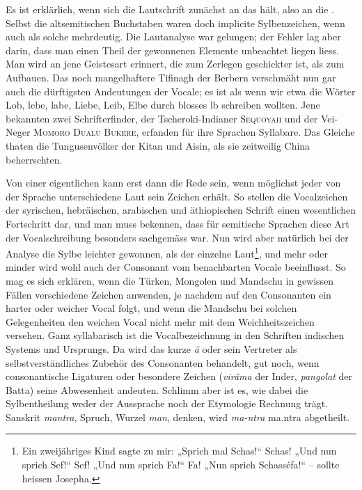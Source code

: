 Es ist erklärlich, wenn sich die Lautschrift zunächst an das  hält, also an die . Selbst die altsemitischen Buchstaben waren doch implicite Sylbenzeichen, wenn auch als solche mehrdeutig. Die Lautanalyse war gelungen; der Fehler lag aber darin, dass man einen Theil der gewonnenen Elemente unbeachtet liegen liess. Man wird an jene Geistesart erinnert, die zum Zerlegen geschickter ist, als zum Aufbauen. Das noch mangelhaftere Tifinagh der Berbern verschmäht nun gar auch die dürftigsten Andeutungen der Vocale; es ist als wenn wir \label{fp.140} etwa die Wörter Lob, lebe, labe, Liebe, Leib, Elbe durch blosses lb schreiben wollten. Jene bekannten zwei Schrifterfinder, der Tscheroki-Indianer \textsc{Sequoyah} und der Vei-Neger \textsc{Momoro Dualu Bukere}, erfanden für ihre Sprachen Syllabare. Das Gleiche thaten die Tungusenvölker der Kitan und Aisin, als sie zeitweilig China beherrschten.

\largerpage[1]Von einer eigentlichen  kann erst dann die Rede sein, wenn möglichst jeder von der Sprache unterschiedene Laut sein Zeichen erhält. So stellen die Vocalzeichen der syrischen, hebräischen, arabischen und äthiopischen Schrift einen wesentlichen Fortschritt dar, und man muss bekennen, dass für semitische Sprachen diese Art der Vocalschreibung besonders sachgemäss war. Nun wird aber natürlich bei der Analyse die Sylbe leichter gewonnen, als der einzelne Laut\footnote{Ein zweijähriges Kind sagte zu mir: „Sprich mal Schas!“ Schas! „Und nun sprich Sef!“ Sef! „Und nun sprich Fa!“ Fa! „Nun sprich Schasséfa!“ – sollte heissen Josepha.}, und mehr oder minder wird wohl auch der Consonant vom benachbarten Vocale beeinflusst. So mag es sich erklären, wenn die Türken, Mongolen und Mandschu in gewissen Fällen verschiedene Zeichen anwenden, je nachdem auf den Consonanten ein harter oder weicher Vocal folgt, und wenn die Mandschu bei solchen Gelegenheiten den weichen Vocal nicht mehr mit dem Weichheitszeichen versehen. Ganz syllabarisch ist die Vocalbezeichnung in den Schriften indischen Systems und Ursprungs. Da wird das kurze \textit{ă} oder sein Vertreter als selbstverständliches Zubehör des Consonanten behandelt, gut noch, wenn consonantische Ligaturen oder besondere Zeichen (\textit{virâma} der Inder, \textit{pangolat} der Batta) seine Abwesenheit andeuten. Schlimm aber ist es, wie dabei die Sylbentheilung weder der Aussprache noch der Etymologie Rechnung \label{sp.132} trägt. Sanskrit \textit{mantra}, Spruch, Wurzel \textit{man}, denken, wird \textit{ma-ntra} {\skt ma.ntra} abgetheilt.

